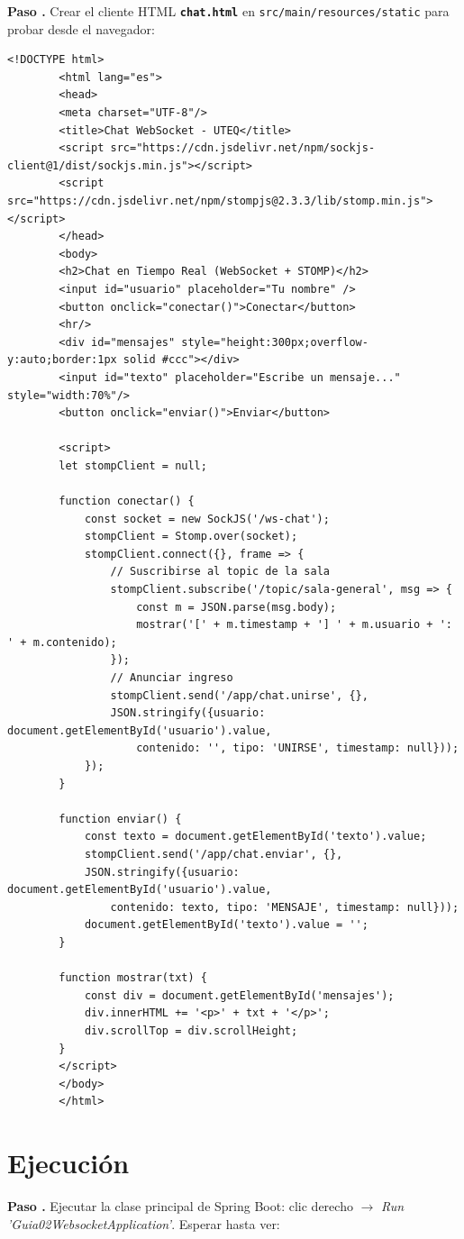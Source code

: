 \documentclass[12pt, a4paper, openany]{book}
\newcounter{paso}[section]
\newcommand{\paso}[1]{%
	\stepcounter{paso}%
	\medskip\noindent
	\begin{tcolorbox}[enhanced, colback=white, colframe=practiceBlue,
		boxrule=0.8pt, arc=3pt, left=6pt, right=6pt, top=4pt, bottom=4pt,
		before upper={\noindent}]
		\textcolor{practiceBlue}{\textbf{Paso \arabic{paso}.}} #1
	\end{tcolorbox}%
}
\newcommand{\code}[1]{\texttt{\small#1}}
\newcommand{\archivo}[1]{\texttt{\textbf{#1}}}
\newcommand{\menu}[1]{\textit{#1}}
\begin{document}
	\paso{Crear el cliente HTML \archivo{chat.html} en \code{src/main/resources/static}
		para probar desde el navegador:}
	
	\begin{lstlisting}[style=XMLStyle, caption={chat.html --- Cliente WebSocket en el navegador}]
		<!DOCTYPE html>
		<html lang="es">
		<head>
		<meta charset="UTF-8"/>
		<title>Chat WebSocket - UTEQ</title>
		<script src="https://cdn.jsdelivr.net/npm/sockjs-client@1/dist/sockjs.min.js"></script>
		<script src="https://cdn.jsdelivr.net/npm/stompjs@2.3.3/lib/stomp.min.js"></script>
		</head>
		<body>
		<h2>Chat en Tiempo Real (WebSocket + STOMP)</h2>
		<input id="usuario" placeholder="Tu nombre" />
		<button onclick="conectar()">Conectar</button>
		<hr/>
		<div id="mensajes" style="height:300px;overflow-y:auto;border:1px solid #ccc"></div>
		<input id="texto" placeholder="Escribe un mensaje..." style="width:70%"/>
		<button onclick="enviar()">Enviar</button>
		
		<script>
		let stompClient = null;
		
		function conectar() {
			const socket = new SockJS('/ws-chat');
			stompClient = Stomp.over(socket);
			stompClient.connect({}, frame => {
				// Suscribirse al topic de la sala
				stompClient.subscribe('/topic/sala-general', msg => {
					const m = JSON.parse(msg.body);
					mostrar('[' + m.timestamp + '] ' + m.usuario + ': ' + m.contenido);
				});
				// Anunciar ingreso
				stompClient.send('/app/chat.unirse', {},
				JSON.stringify({usuario: document.getElementById('usuario').value,
					contenido: '', tipo: 'UNIRSE', timestamp: null}));
			});
		}
		
		function enviar() {
			const texto = document.getElementById('texto').value;
			stompClient.send('/app/chat.enviar', {},
			JSON.stringify({usuario: document.getElementById('usuario').value,
				contenido: texto, tipo: 'MENSAJE', timestamp: null}));
			document.getElementById('texto').value = '';
		}
		
		function mostrar(txt) {
			const div = document.getElementById('mensajes');
			div.innerHTML += '<p>' + txt + '</p>';
			div.scrollTop = div.scrollHeight;
		}
		</script>
		</body>
		</html>
	\end{lstlisting}
	
	\section{Ejecución}
	
	\paso{Ejecutar la clase principal de Spring Boot: clic derecho $\to$
		\menu{Run 'Guia02WebsocketApplication'}. Esperar hasta ver:}
	
\end{document}

